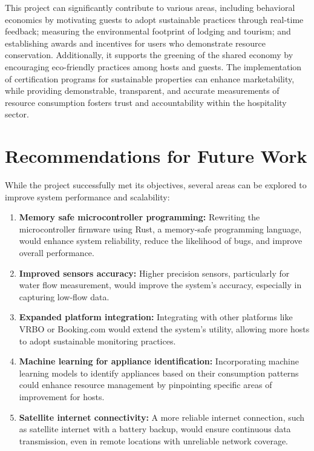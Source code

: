 This project can significantly contribute to various areas, including behavioral economics by motivating guests to adopt 
sustainable practices through real-time feedback; measuring the environmental footprint of lodging and tourism; and 
establishing awards and incentives for users who demonstrate resource conservation. Additionally, it supports the 
greening of the shared economy by encouraging eco-friendly practices among hosts and guests. The implementation of 
certification programs for sustainable properties can enhance marketability, while providing demonstrable, transparent, 
and accurate measurements of resource consumption fosters trust and accountability within the hospitality sector.

\section{Recommendations for Future Work}

While the project successfully met its objectives, several areas can be explored to improve system performance and 
scalability:

\begin{enumerate}
  \item \textbf{Memory safe microcontroller programming:} Rewriting the microcontroller firmware using Rust, a 
  memory-safe programming language, would enhance system reliability, reduce the likelihood of bugs, and improve 
  overall performance.
  \item \textbf{Improved sensors accuracy:} Higher precision sensors, particularly for water flow measurement, would 
  improve the system's accuracy, especially in capturing low-flow data.
  \item \textbf{Expanded platform integration:} Integrating with other platforms like VRBO or Booking.com would extend 
  the system's utility, allowing more hosts to adopt sustainable monitoring practices.
  \item \textbf{Machine learning for appliance identification:} Incorporating machine learning models to identify 
  appliances based on their consumption patterns could enhance resource management by pinpointing specific areas of 
  improvement for hosts.
  \item \textbf{Satellite internet connectivity:} A more reliable internet connection, such as satellite internet with
  a battery backup, would ensure continuous data transmission, even in remote locations with unreliable network 
  coverage.
\end{enumerate}
    
